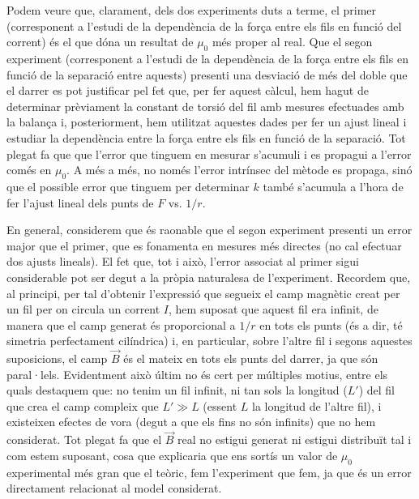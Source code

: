 \documentclass[a4paper,10.5pt]{report}
\begin{document}
Podem veure que, clarament, dels dos experiments duts a terme, el primer (corresponent a l'estudi de la dependència de la força entre els fils en funció del corrent) és el que dóna un resultat de $\mu_0$ més proper al real. Que el segon experiment (corresponent a l'estudi de la dependència de la força entre els fils en funció de la separació entre aquests) presenti una desviació de més del doble que el darrer es pot justificar pel fet que, per fer aquest càlcul, hem hagut de determinar prèviament la constant de torsió del fil amb mesures efectuades amb la balança i, posteriorment, hem utilitzat aquestes dades per fer un ajust lineal i estudiar la dependència entre la força entre els fils en funció de la separació. Tot plegat fa que que l'error que tinguem en mesurar s'acumuli i es propagui a l'error comés en $\mu_0$. A més a més, no només l'error intrínsec del mètode es propaga, sinó que el possible error que tinguem per determinar $k$ també s'acumula a l'hora de fer l'ajust lineal dels punts de $F$ vs. $1/r$.

En general, considerem que és raonable que el segon experiment presenti un error major que el primer, que es fonamenta en mesures més directes (no cal efectuar dos ajusts lineals). El fet que, tot i això, l'error associat al primer sigui considerable pot ser degut a la pròpia naturalesa de l'experiment. Recordem  que, al principi, per tal d'obtenir l'expressió que segueix el camp magnètic creat per un fil per on circula un corrent $I$, hem suposat que aquest fil era infinit, de manera que el camp generat és proporcional a $1/r$ en tots els punts (és a dir, té simetria perfectament cilíndrica) i, en particular, sobre l'altre fil i segons aquestes suposicions, el camp $\vec{B}$ és el mateix en tots els punts del darrer, ja que són paral·lels. Evidentment això últim no és cert per múltiples motius, entre els quals destaquem que: no tenim un fil infinit, ni tan sols la longitud ($L'$) del fil que crea el camp compleix que $L'\gg L$ (essent $L$ la longitud de l'altre fil), i existeixen efectes de vora (degut a que els fins no són infinits) que no hem considerat. Tot plegat fa que el $\vec{B}$ real no estigui generat ni estigui distribuït tal i com estem suposant, cosa que explicaria que ens sortís un valor de $\mu_0$ experimental més gran que el teòric, fem l'experiment que fem, ja que és un error directament relacionat al model considerat.
\end{document}

